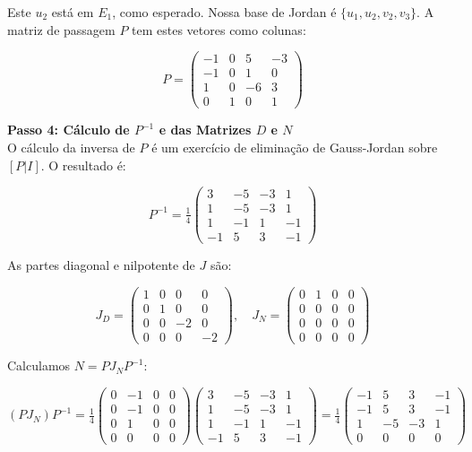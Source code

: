 Este $u_2$ está em $E_1$, como esperado. Nossa base de Jordan é $\{u_1,u_2,v_2,v_3\}$. A matriz de passagem $P$ tem estes vetores como colunas:

\[
P = \begin{pmatrix}
-1 & 0 & 5 & -3 \\
-1 & 0 & 1 & 0 \\
1 & 0 & -6 & 3 \\
0 & 1 & 0 & 1
\end{pmatrix}
\]

\bigskip

\textbf{Passo 4: Cálculo de $P^{-1}$ e das Matrizes $D$ e $N$} \\

O cálculo da inversa de $P$ é um exercício de eliminação de Gauss-Jordan sobre $[P|I]$. O resultado é:

\[
P^{-1} = \tfrac{1}{4}
\begin{pmatrix}
3 & -5 & -3 & 1 \\
1 & -5 & -3 & 1 \\
1 & -1 & 1 & -1 \\
-1 & 5 & 3 & -1
\end{pmatrix}
\]

As partes diagonal e nilpotente de $J$ são:

\[
J_D = \begin{pmatrix}
1 & 0 & 0 & 0 \\
0 & 1 & 0 & 0 \\
0 & 0 & -2 & 0 \\
0 & 0 & 0 & -2
\end{pmatrix}, \quad
J_N = \begin{pmatrix}
0 & 1 & 0 & 0 \\
0 & 0 & 0 & 0 \\
0 & 0 & 0 & 0 \\
0 & 0 & 0 & 0
\end{pmatrix}
\]

Calculamos $N = PJ_NP^{-1}$:

\[
(PJ_N)P^{-1} = \tfrac{1}{4}
\begin{pmatrix}
0 & -1 & 0 & 0 \\
0 & -1 & 0 & 0 \\
0 & 1 & 0 & 0 \\
0 & 0 & 0 & 0
\end{pmatrix}
\begin{pmatrix}
3 & -5 & -3 & 1 \\
1 & -5 & -3 & 1 \\
1 & -1 & 1 & -1 \\
-1 & 5 & 3 & -1
\end{pmatrix}
= \tfrac{1}{4}
\begin{pmatrix}
-1 & 5 & 3 & -1 \\
-1 & 5 & 3 & -1 \\
1 & -5 & -3 & 1 \\
0 & 0 & 0 & 0
\end{pmatrix}
\]

